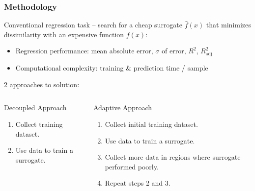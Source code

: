 \begin{frame}
	\frametitle{Methodology}
		Conventional regression task -- search for a cheap surrogate $\hat{f}(x)$ that
		\alert{minimizes dissimilarity} with an expensive function $f(x)$:

		\begin{itemize}
			\item
				Regression performance: mean absolute error, $\sigma$ of
				error, $R^2$, $R^2_\text{adj.}$
			\item
				Computational complexity:
				training \& prediction time / sample
		\end{itemize}

		\vspace{1em}
		2 approaches to solution:
		\vspace{-1em}

		\begin{columns}[t]
			\begin{block}{Decoupled Approach}
				\begin{enumerate}
					\item Collect training dataset.
					\item Use data to train a surrogate.
				\end{enumerate}
			\end{block}

			\hfill
			\begin{block}{Adaptive Approach}
				\begin{enumerate}
					\item Collect initial training dataset.
					\item Use data to train a surrogate.
					\item Collect more data in regions where surrogate performed poorly.
					\item Repeat steps 2 and 3.
				\end{enumerate}
			\end{block}
		\end{columns}


\end{frame}


